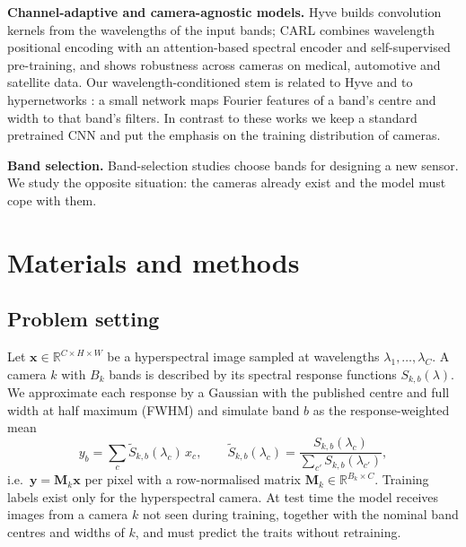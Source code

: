 \documentclass[preprint,12pt,authoryear]{elsarticle}
\begin{document}
\textbf{Channel-adaptive and camera-agnostic models.} Hyve \citep{varga2023hyve} builds convolution kernels from the
wavelengths of the input bands; CARL \citep{baumann2025carl} combines wavelength positional encoding with an
attention-based spectral encoder and self-supervised pre-training, and shows robustness across cameras on medical,
automotive and satellite data. Our wavelength-conditioned stem is related to Hyve and to hypernetworks
\citep{ha2017hypernetworks}: a small network maps Fourier features \citep{tancik2020fourier} of a band's centre and
width to that band's filters. In contrast to these works we keep a standard pretrained CNN and put the emphasis on the
training distribution of cameras.

\textbf{Band selection.} Band-selection studies \citep{morales2021bandselection} choose bands for designing a new sensor.
We study the opposite situation: the cameras already exist and the model must cope with them.

\section{Materials and methods}

\subsection{Problem setting}
Let $\mathbf{x}\in\mathbb{R}^{C\times H\times W}$ be a hyperspectral image sampled at wavelengths
$\lambda_1,\dots,\lambda_C$. A camera $k$ with $B_k$ bands is described by its spectral response functions
$S_{k,b}(\lambda)$. We approximate each response by a Gaussian with the published centre and full width at half maximum
(FWHM) and simulate band $b$ as the response-weighted mean
\begin{equation}
y_b = \sum_{c} \tilde S_{k,b}(\lambda_c)\, x_c, \qquad \tilde S_{k,b}(\lambda_c) = \frac{S_{k,b}(\lambda_c)}{\sum_{c'} S_{k,b}(\lambda_{c'})},
\end{equation}
i.e.\ $\mathbf{y}=\mathbf{M}_k\mathbf{x}$ per pixel with a row-normalised matrix $\mathbf{M}_k\in\mathbb{R}^{B_k\times C}$.
Training labels exist only for the hyperspectral camera. At test time the model receives images from a camera $k$ not
seen during training, together with the nominal band centres and widths of $k$, and must predict the traits without
retraining.
\end{document}
